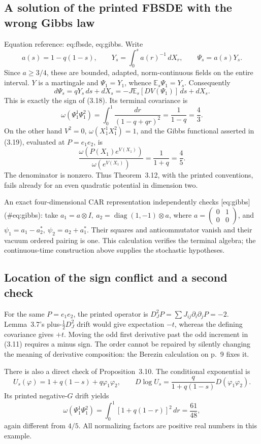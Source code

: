 \documentclass[10pt]{article}
\begin{document}
\subsection*{A solution of the printed FBSDE with the wrong Gibbs law}
Equation reference: eq:fbsde, eq:gibbs. Write \[a(s)=1-q(1-s),\qquad
 Y_s=\int_0^s a(r)^{-1}\,dX_r,\qquad
 \Psi_s=a(s)Y_s.\] Since \(a\geq3/4\), these are bounded, adapted, norm-continuous fields on the entire interval. \(Y\) is a martingale and \(\Psi_1=Y_1\), whence \(\mathbb E_s\Psi_1=Y_s\). Consequently \[d\Psi_s=qY_s\,ds+dX_s
       =-J\mathbb E_s[DV(\Psi_1)]\,ds+dX_s .\] This is exactly the sign of (3.18). Its terminal covariance is \[\omega(\Psi_1^1\Psi_1^2)
   =\int_0^1\frac{dr}{(1-q+qr)^2}
   =\frac1{1-q}=\frac43.                         \] On the other hand \(V^2=0\), \(\omega(X_1^1X_1^2)=1\), and the Gibbs functional asserted in (3.19), evaluated at \(P=e_1e_2\), is \[\frac{\omega(P(X_1)e^{V(X_1)})}{\omega(e^{V(X_1)})}
       =\frac1{1+q}=\frac45.                     \] The denominator is nonzero. Thus Theorem 3.12, with the printed conventions, fails already for an even quadratic potential in dimension two.\par
An exact four-dimensional CAR representation independently checks [eq:gibbs] (\#eq:gibbs): take \(a_1=a\otimes I,\ a_2=\operatorname{diag}(1,-1)\otimes a\), where \(a=\left(\begin{smallmatrix}0&1\\0&0\end{smallmatrix}\right)\), and \(\psi_1=a_1-a_2^*,\ \psi_2=a_2+a_1^*\). Their squares and anticommutator vanish and their vacuum ordered pairing is one. This calculation verifies the terminal algebra; the continuous-time construction above supplies the stochastic hypotheses.\par
\subsection*{Location of the sign conflict and a second check}
For the same \(P=e_1e_2\), the printed operator is \(D_J^2P=\sum J_{ij}\partial_i\partial_jP=-2\). Lemma 3.7’s plus-\(\tfrac12D_J^2\) drift would give expectation \(-t\), whereas the defining covariance gives \(+t\). Moving the odd first derivative past the odd increment in (3.11) requires a minus sign. The order cannot be repaired by silently changing the meaning of derivative composition: the Berezin calculation on p. 9 fixes it.\par
There is also a direct check of Proposition 3.10. The conditional exponential is \[U_s(\varphi)=1+q(1-s)+q\varphi_1\varphi_2,
 \qquad D\log U_s=\frac{q}{1+q(1-s)}D(\varphi_1\varphi_2).\] Its printed negative-\(G\) drift yields \[\omega(\Psi_1^1\Psi_1^2)
       =\int_0^1[1+q(1-r)]^2\,dr=\frac{61}{48},\] again different from \(4/5\). All normalizing factors are positive real numbers in this example.\par
\end{document}
